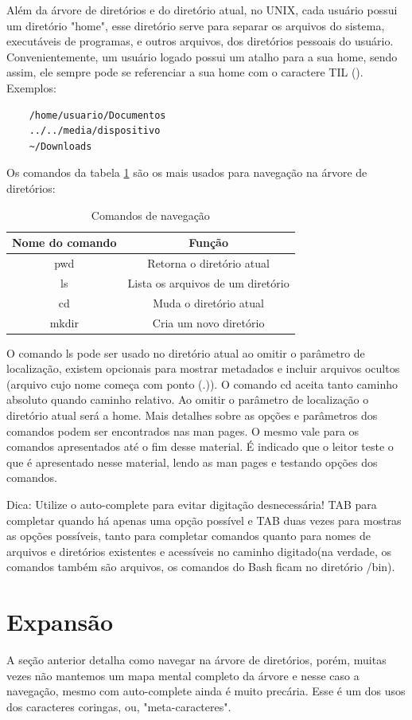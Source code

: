 	Além da árvore de diretórios e do diretório atual, no UNIX, cada usuário possui um diretório "home", esse diretório serve para separar os arquivos do sistema, executáveis de programas, e outros arquivos, dos diretórios pessoais do usuário. Convenientemente, um usuário logado possui um atalho para a sua home, sendo assim, ele sempre pode se referenciar a sua home com o caractere TIL (\texttildelow).
	Exemplos: 
	\begin{lstlisting}
	/home/usuario/Documentos
	../../media/dispositivo
	~/Downloads
	\end{lstlisting}
	Os comandos da tabela \ref{table:1} são os mais usados para navegação na árvore de diretórios:
	
	\begin{table}[!ht]
		\centering
		\begin{tabular}{ | c | c | } 
			\hline
			\bfseries Nome do comando & \bfseries Função \\
			\hline
			pwd & Retorna o diretório atual \\
			\hline
			ls & Lista os arquivos de um diretório \\
			\hline
			cd & Muda o diretório atual \\
			\hline
			mkdir & Cria um novo diretório \\
			\hline
		\end{tabular}
		\caption{Comandos de navegação}
		\label{table:1}
	\end{table}
	O comando ls pode ser usado no diretório atual ao omitir o parâmetro de localização, existem opcionais para mostrar metadados e incluir arquivos ocultos (arquivo cujo nome começa com ponto (.)). O comando cd aceita tanto caminho absoluto quando caminho relativo. Ao omitir o parâmetro de localização o diretório atual será a home. Mais detalhes sobre as opções e parâmetros dos comandos podem ser encontrados nas man pages. O mesmo vale para os comandos apresentados até o fim desse material. É indicado que o leitor teste o que é apresentado nesse material, lendo as man pages e testando opções dos comandos.
	
	Dica: Utilize o auto-complete para evitar digitação desnecessária! TAB para completar quando há apenas uma opção possível e TAB duas vezes para mostras as opções possíveis, tanto para completar comandos quanto para nomes de arquivos e diretórios existentes e acessíveis no caminho digitado(na verdade, os comandos também são arquivos, os comandos do Bash ficam no diretório /bin).
	\section{Expansão}
	A seção anterior detalha como navegar na árvore de diretórios, porém, muitas vezes não mantemos um mapa mental completo da árvore e nesse caso a navegação, mesmo com auto-complete ainda é muito precária. Esse é um dos usos dos caracteres coringas, ou, "meta-caracteres".
	
